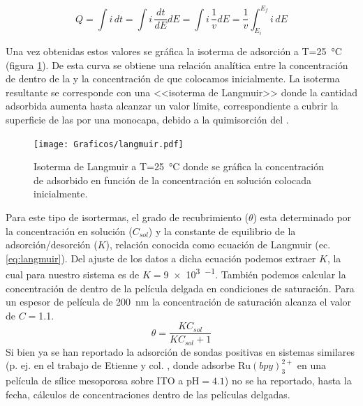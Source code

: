 			\begin{equation}
					Q=\int i\,dt = \int i\, \frac{dt}{dE} dE = \int i\,\frac{1}{v}dE=\frac{1}{v}\int_{E_{i}}^{E_{f}} i\,dE
					\label{eq:carga}
			\end{equation}

		Una vez obtenidas estos valores se gráfica la isoterma de adsorción a T=\SI{25}{\celsius} (figura \ref{fig:langmuir}). De esta curva se obtiene una relación analítica entre la concentración de \ru\space dentro de la \pdm\space y la concentración de \ru\space que colocamos inicialmente. La isoterma resultante se corresponde con una <<isoterma de Langmuir>> donde la cantidad adsorbida aumenta hasta alcanzar un valor límite, correspondiente a cubrir la superficie de las \pdm\space por una monocapa, debido a la quimisorción del \ru.\cite{langmuir1918}

			\begin{figure}[ht]
					\centering
			 	    \texttt{[image: Graficos/langmuir.pdf]}
			        \caption[Isoterma de Langmuir]{Isoterma de Langmuir a T=\SI{25}{\celsius} donde se gráfica la concentración de \aminorutenio\space adsorbido en función de la concentración en solución colocada inicialmente.}
			        \label{fig:langmuir}
			      	\end{figure} 	
	
		Para este tipo de isortermas, el grado de recubrimiento ($\theta$) esta determinado por la concentración en solución ($C_{sol}$) y la constante de equilibrio de la adsorción/desorción ($K$), relación conocida como ecuación de Langmuir (ec. \ref{eq:langmuir}).  Del ajuste de los datos a dicha ecuación podemos extraer $K$, la cual para nuestro sistema es de $K=$\SI{9e3}{\Molar^{-1}}. También podemos calcular la concentración de \ru\space dentro de la película delgada en condiciones de saturación. Para un espesor de película de \SI{200}{nm} la concentración de saturación alcanza el valor de $C\!=$\SI{1.1}{\Molar}.
			\begin{equation}
					\theta = \frac{KC_{sol}}{KC_{sol}+1}
					\label{eq:langmuir}
			\end{equation}
		Si bien ya se han reportado la adsorción de sondas positivas en sistemas similares (p. ej. en el trabajo de Etienne y col. \cite{Etienne2007}, donde adsorbe $\text{Ru}(bpy)_3^{2+}$ en una película de sílice mesoporosa sobre ITO a $\text{pH}=4.1$) no se ha reportado, hasta la fecha, cálculos de concentraciones dentro de las películas delgadas.

